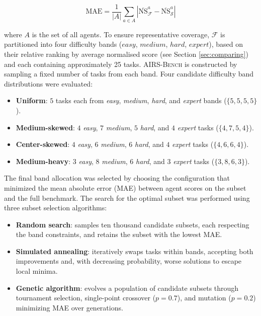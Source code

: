 \documentclass{fairmeta}
\newcommand{\airsbench}{\textsc{AIRS-Bench}}
\begin{document}
\begin{equation}
    \mathrm{MAE} = \frac{1}{|A|} \sum_{a \in A} \left| \overline{\text{NS}}^a_\mathcal{F} - \overline{\text{NS}}^a_{\mathcal{S}} \right|
\end{equation}

where $A$ is the set of all agents. To ensure representative coverage, $\mathcal{F}$ is partitioned into four difficulty bands ($easy$, $medium$, $hard$, $expert$), based on their relative ranking by average normalised score (see Section \ref{sec:comparing}) and each containing approximately 25 tasks. \airsbench{} is constructed by sampling a fixed number of tasks from each band. Four candidate difficulty band distributions were evaluated:
\begin{itemize}
    \item \textbf{Uniform}: $5$ tasks each from \textit{easy}, \textit{medium}, \textit{hard}, and \textit{expert} bands ($\{5, 5, 5, 5\}$).
    \item \textbf{Medium-skewed}: $4$ \textit{easy}, $7$ \textit{medium}, $5$ \textit{hard}, and $4$ \textit{expert} tasks ($\{4, 7, 5, 4\}$).
    \item \textbf{Center-skewed}: $4$ \textit{easy}, $6$ \textit{medium}, $6$ \textit{hard}, and $4$ \textit{expert} tasks ($\{4, 6, 6, 4\}$).
    \item \textbf{Medium-heavy}: $3$ \textit{easy}, $8$ \textit{medium}, $6$ \textit{hard}, and $3$ \textit{expert} tasks ($\{3, 8, 6, 3\}$).
\end{itemize}
The final band allocation was selected by choosing the configuration that minimized the mean absolute error (MAE) between agent scores on the subset and the full benchmark. The search for the optimal subset was performed using three subset selection algorithms:
\begin{itemize}
    \item \textbf{Random search}: samples ten thousand candidate subsets, each respecting the band constraints, and retains the subset with the lowest MAE.
    \item \textbf{Simulated annealing}: iteratively swaps tasks within bands, accepting both improvements and, with decreasing probability, worse solutions to escape local minima.
    \item \textbf{Genetic algorithm}: evolves a population of candidate subsets through tournament selection, single-point crossover ($p=0.7$), and mutation ($p=0.2$) minimizing MAE over generations.
\end{itemize}
\end{document}
